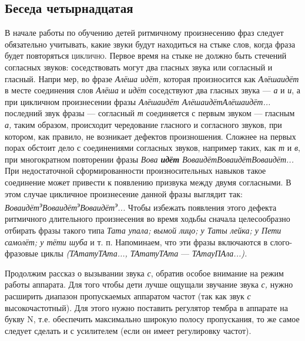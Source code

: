\documentclass[a5paper]{book}
\renewcommand{\emph}[1]{\textit{#1}}
\begin{document}
\subsection*{Беседа четырнадцатая}

В начале работы по обучению детей ритмичному произнесению фраз следует
обязательно учитывать, какие звуки будут находиться на стыке слов, когда
фраза будет повторяться \textsc{циклично.} Первое время на стыке не
должно быть стечений согласных звуков: соседствовать могут два гласных
звука или согласный и гласный. Напри мер, во фразе \emph{Алёша идёт,}
которая произносится как \emph{Алёшаидёт} в месте соединения слов
\emph{Алёша} и \emph{идёт} соседствуют два гласных звука --- \emph{а} и
\emph{и}, а при цикличном произнесении фразы \emph{Алёшаидёт
АлёшаидётАлёшаидёт...} последний звук фразы --- согласный \emph{т}
соединяется с первым звуком --- гласным \emph{а,} таким образом,
происходит чередование гласного и согласного звуков, при котором, как
правило, не возникает дефектов произношения. Сложнее на первых порах
обстоит дело с соединениями согласных звуков, например таких, как
\emph{т} и \emph{в}, при многократном повторении фразы \emph{Вова
\textbf{идёт} ВоваидётВоваидётВоваидёт...} При недостаточной
сформированности произносительных навыков такое соединение может
привести к появлению призвука между двумя согласными. В этом случае
цикличное произнесение данной фразы выглядит так:
\emph{Воваидёт\textsuperscript{э}Воваидёт\textsuperscript{э}Воваидёт\textsuperscript{э}...}
Чтобы избежать появления этого дефекта ритмичного длительного
произнесения во время ходьбы сначала целесообразно отбирать фразы такого
типа \emph{Тата упала; вымой лицо; у Таты лейка; у Пети самолёт; у тёти
шуба} и т. п. Напоминаем, что эти фразы включаются в слого-фразовые
циклы \emph{(ТАтатуТАта..., ТАтатуТАта} --- \emph{ТАтауПАла...).}

Продолжим рассказ о вызывании звука \emph{с}, обратив особое внимание на
режим работы аппарата. Для того чтобы дети лучше ощущали звучание звука
\emph{с,} нужно расширить диапазон пропускаемых аппаратом частот (так
как звук \emph{с} высокочастотный). Для этого нужно поставить регулятор
тембра в аппарате на букву N, т.е. обеспечить максимально широкую полосу
пропускания, то же самое следует сделать и с усилителем (если он имеет
регулировку частот).
\end{document}
